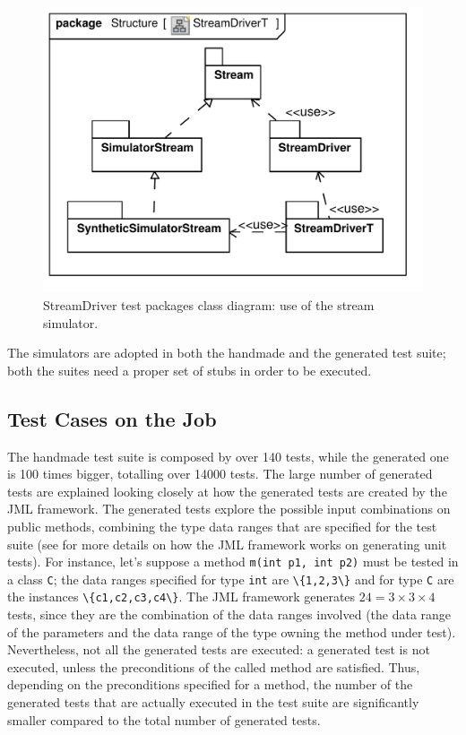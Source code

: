\documentclass[english]{lni}
\newcommand{\lil}[1]{\texttt{\lstinline|#1|}}
\begin{document}
\begin{figure}[htb!]
  \centering
  \includegraphics[scale=0.35]{UML_model/Class_Diagram__Structure__StreamDriverT}
  \caption{StreamDriver test packages class diagram: use of the stream
    simulator.}
  \label{fig:class_diagram_streamdriver_test}
\end{figure}

The simulators are adopted in both the handmade and the generated test suite; both the suites need a proper set of stubs in order to be executed.



\subsection{Test Cases on the Job}
\label{subsec:test_cases_on_the_job}

The handmade test suite is composed by over 140 tests, while the generated one is 100 times bigger, totalling over 14000 tests.
The large number of generated tests are explained looking closely at how the generated tests are created by the JML framework. 
The generated tests explore the possible input combinations on public methods, combining the type data ranges that are specified for the test suite (see \cite{Cheon-Leavens02} for more details on how the JML framework works on generating unit tests). 
For instance, let's suppose a method \lil{m(int p1, int p2)} must be tested in a class \lil{C}; the data ranges specified for type \lil{int} are \lil{\{1,2,3\}} and for type \lil{C} are the instances \lil{\{c1,c2,c3,c4\}}. 
The JML framework generates $24 = 3 \times 3 \times 4$ tests, since they are the combination of the data ranges involved (the data range of the parameters and the data range of the type owning the method under test). 
Nevertheless, not all the generated tests are executed: a generated test is not executed, unless the preconditions of the called method are satisfied. 
Thus, depending on the preconditions specified for a method, the number of the generated tests that are actually executed in the test suite are significantly smaller compared to the total number of generated tests.
\end{document}

